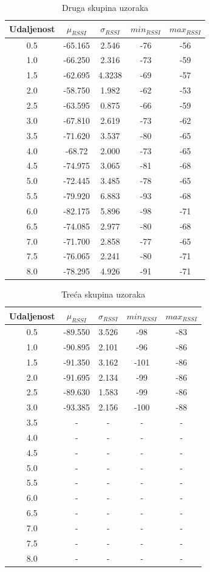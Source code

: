 \begin{table}[H]
	\centering
	\caption{Druga skupina uzoraka}
	\label{tbl:indoorKontaktMaxTx}
	\begin{tabular}{ccccc}
	\hline 
	Udaljenost & $\mu_{RSSI}$ & $\sigma_{RSSI}$ & $min_{RSSI}$ & $max_{RSSI}$ \\ 
	\hline 
	0.5 & -65.165 & 2.546 & -76 & -56 \\
	1.0 & -66.250 & 2.316 & -73 & -59 \\
	1.5 & -62.695 & 4.3238 & -69 & -57 \\
	2.0 & -58.750 & 1.982 & -62 & -53 \\
	2.5 & -63.595 & 0.875 & -66 & -59 \\
	3.0 & -67.810 & 2.619 & -73 & -62 \\
	3.5 & -71.620 & 3.537 & -80 & -65 \\
	4.0 & -68.72 & 2.000 & -73 & -65 \\
	4.5 & -74.975 & 3.065 & -81 & -68 \\
	5.0 & -72.445 & 3.485 & -78 & -65 \\
	5.5 & -79.920 & 6.883 & -93 & -68 \\
	6.0 & -82.175 & 5.896 & -98 & -71 \\
	6.5 & -74.085 & 2.977 & -80 & -68 \\
	7.0 & -71.700 & 2.858 & -77 & -65 \\
	7.5 & -76.065 & 2.241 & -80 & -71 \\
	8.0 & -78.295 & 4.926 & -91 & -71 \\
	\hline
	\end{tabular}
\end{table}

\begin{table}[H]
	\centering
	\caption{Treća skupina uzoraka}
	\label{tbl:blucatsDefault}
	\begin{tabular}{ccccc}
	\hline
	Udaljenost & $\mu_{RSSI}$ & $\sigma_{RSSI}$ & $min_{RSSI}$ & $max_{RSSI}$ \\
	\hline
	0.5 & -89.550 & 3.526 & -98 & -83 \\
	1.0 & -90.895 & 2.101 & -96 & -86 \\
	1.5 & -91.350 & 3.162 & -101 & -86 \\
	2.0 & -91.695 & 2.134 & -99 & -86 \\
	2.5 & -89.630 & 1.583 & -99 & -86 \\
	3.0 & -93.385 & 2.156 & -100 & -88 \\
	3.5 & - & - & - & - \\
	4.0 & - & - & - & - \\
	4.5 & - & - & - & - \\
	5.0 & - & - & - & - \\
	5.5 & - & - & - & - \\
	6.0 & - & - & - & - \\
	6.5 & - & - & - & - \\
	7.0 & - & - & - & - \\
	7.5 & - & - & - & - \\
	8.0 & - & - & - & - \\
	\hline
	\end{tabular}
\end{table}

